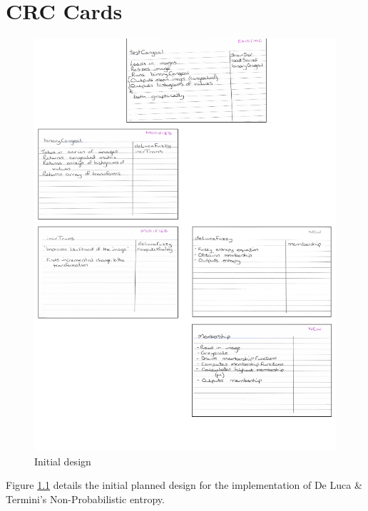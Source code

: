 \chapter{CRC Cards}
\begin{figure}[H]
  \center
  \includegraphics[scale=0.5]{Appendix4/imgs/initial.png}
  \caption{Initial design}
  \label{fig:initial-design}
\end{figure}

Figure \ref{fig:initial-design} details the initial planned design for the implementation of De Luca \& Termini's Non-Probabilistic entropy.
